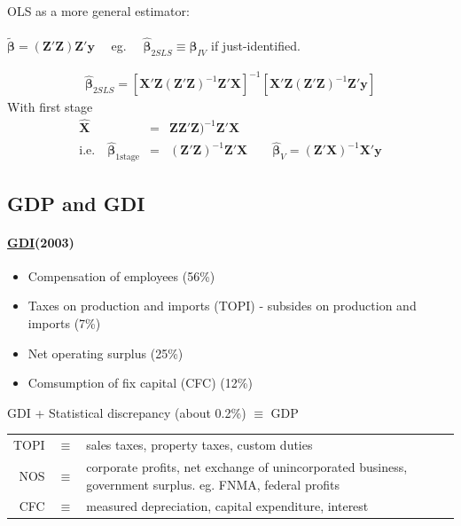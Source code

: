 ~\\
\noindent OLS as a more general estimator:\\
\\
$\boldsymbol{\tilde{\beta}}=(\boldsymbol{Z'Z})\boldsymbol{Z'y}\quad$ eg. $\quad\boldsymbol{\hat{\beta}}_{2SLS}\equiv\boldsymbol{\beta}_{IV}$ if just-identified.\\
\begin{center}
\end{center}
\begin{eqnarray*}
\boldsymbol{\hat{\beta}}_{2SLS} = [\boldsymbol{X'Z}(\boldsymbol{Z'Z})^{-1}\boldsymbol{Z'X}]^{-1}[\boldsymbol{X'Z}(\boldsymbol{Z'Z})^{-1}\boldsymbol{Z'y}]
\end{eqnarray*}
With first stage\\
\begin{eqnarray*}
\boldsymbol{\hat{X}} &=& \boldsymbol{Z}\boldsymbol{Z'Z})^{-1}\boldsymbol{Z'X}\\
\text{i.e.}\quad\boldsymbol{\hat{\beta}}_{\text{1stage}} &=& (\boldsymbol{Z'Z})^{-1}\boldsymbol{Z'X}\qquad\boldsymbol{\hat{\beta}}_{V}=(\boldsymbol{Z'X})^{-1}\boldsymbol{X'y}
\end{eqnarray*}

\subsection{GDP and GDI}
\paragraph{\underline{GDI}(2003)}
\begin{itemize}
\item Compensation of employees (56\%)
\item Taxes on production and imports (TOPI) - subsides on production and imports (7\%)
\item Net operating surplus (25\%)
\item Comsumption of fix capital (CFC) (12\%)
\end{itemize}
GDI + Statistical discrepancy (about 0.2\%) $\equiv$ GDP
\begin{center}
\begin{tabular}{rrp{8cm}}
TOPI & $\equiv$ & sales taxes, property taxes, custom duties\\
NOS & $\equiv$ & corporate profits, net exchange of unincorporated business, government surplus. eg. FNMA, federal profits\\
CFC & $\equiv$ & measured depreciation, capital expenditure, interest
\end{tabular}
\end{center}
